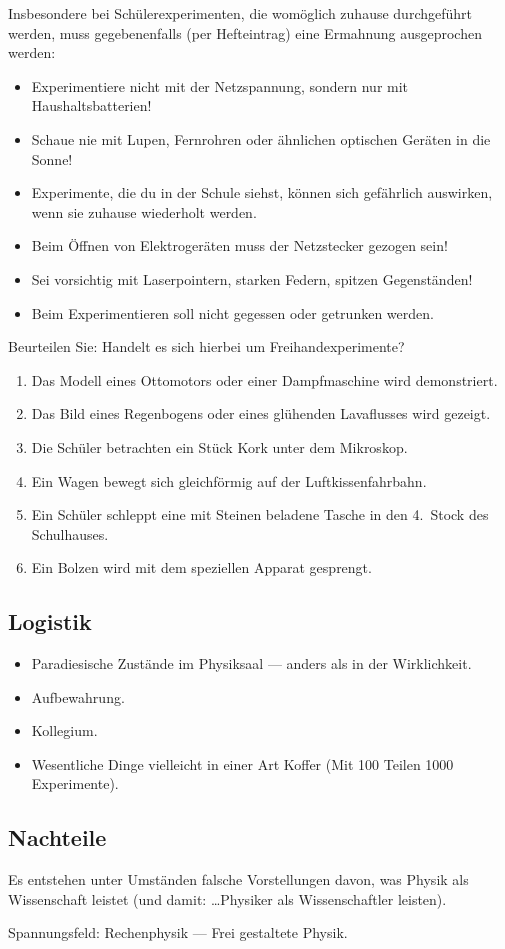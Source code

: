 \begin{itemize}
	\mip
	Insbesondere bei Sch\"{u}lerexperimenten, die wom\"{o}glich zuhause
	durchgef\"{u}hrt werden, muss gegebenenfalls (per Hefteintrag)
	eine Ermahnung ausgeprochen werden:
	\begin{itemize}
		\item
		Experimentiere nicht mit der Netzspannung, sondern nur mit
		Haushaltsbatterien!
		\item
		Schaue nie mit Lupen, Fernrohren oder \"{a}hnlichen optischen
		Ger\"{a}ten in die Sonne!
		\item
		Experimente, die du in der Schule siehst, k\"{o}nnen sich
		gef\"{a}hrlich auswirken, wenn sie zuhause wiederholt werden.
		\item
		Beim \"{O}ffnen von Elektroger\"{a}ten muss der Netzstecker gezogen sein!
		\item
		Sei vorsichtig mit Laserpointern, starken Federn, spitzen
		Gegenst\"{a}nden!
		\item
		Beim Experimentieren soll nicht gegessen oder getrunken werden.
	\end{itemize}

\end{itemize}

\begin{uea}
	Beurteilen Sie: Handelt es sich hierbei um Freihandexperimente?
	\begin{enumerate}[label=\alph*.]
			\item
		Das Modell eines Ottomotors oder einer Dampfmaschine
		wird demonstriert.
		\item
		Das Bild eines Regenbogens oder eines gl\"{u}henden Lavaflusses
		wird gezeigt.
		\item
		Die Sch\"{u}ler betrachten ein St\"{u}ck Kork unter dem Mikroskop.
		\item
		Ein Wagen bewegt sich gleichf\"{o}rmig auf der Luftkissenfahrbahn.
		\item
		Ein Sch\"{u}ler schleppt eine mit Steinen beladene Tasche in den
		4.\ Stock des Schulhauses.
		\item
		Ein Bolzen wird mit dem speziellen Apparat gesprengt. 
	\end{enumerate}
\end{uea}

\subsection{Logistik}

\begin{itemize}
	\item Paradiesische Zust\"{a}nde im Physiksaal ---  anders als in der Wirklichkeit.
	\item Aufbewahrung.
	\item Kollegium.
	\item Wesentliche Dinge vielleicht in einer Art Koffer (Mit 100 Teilen 1000 Experimente).
\end{itemize}

\subsection{Nachteile}

Es entstehen unter Umst\"{a}nden falsche Vorstellungen davon,
was Physik als Wissenschaft leistet
(und damit: \dots Physiker als Wissenschaftler leisten).

Spannungsfeld: Rechenphysik --- Frei gestaltete Physik.
